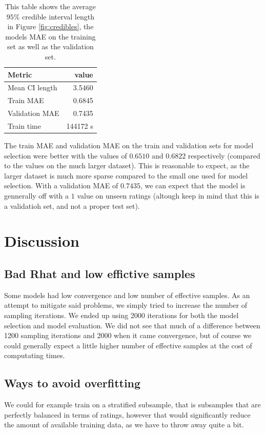 \documentclass[12pt]{article}
\begin{document}
\begin{table}[H]
    \centering
    \caption{This table shows the average $95\%$ credible interval length in Figure \ref{fig:credibles}, the models MAE on the training set as well as the validation set.}
    \begin{tabular}{l|r}
        \toprule
        Metric & value \\
        \midrule
        Mean CI length & 3.5460 \\
        Train MAE & 0.6845 \\
        Validation MAE & 0.7435 \\
        Train time & 144172 s\\
        \bottomrule
    \end{tabular}
\end{table}
The train MAE and validation MAE on the train and validation sets for model selection were better with the values of $0.6510$ and $0.6822$ respectively (compared to the values on the much larger dataset). This is reasonable to expect, as the larger dataset is much more sparse compared to the small one used for model selection. With a validation MAE of $0.7435$, we can expect that the model is gennerally off with a $1$ value on unseen ratings (altough keep in mind that this is a validatioh set, and not a proper test set). 

\section{Discussion}
    \subsection*{Bad Rhat and low effictive samples}
    Some models had low convergence and low number of effective samples. As an attempt to mitigate said problems, we simply tried to increase the number of sampling iterations. We ended up using 2000 iterations for both the model selection and model evaluation. We did not see that much of a difference between 1200 sampling iterations and 2000 when it came convergence, but of course we could generally expect a little higher number of effective samples at the cost of computating times.

    \subsection*{Ways to avoid overfitting}
    We could for example train on a stratified subsample, that is subsamples that are perfectly balanced in terms of ratings, however that would significantly reduce the amount of available training data, as we have to throw away quite a bit.
\end{document}
